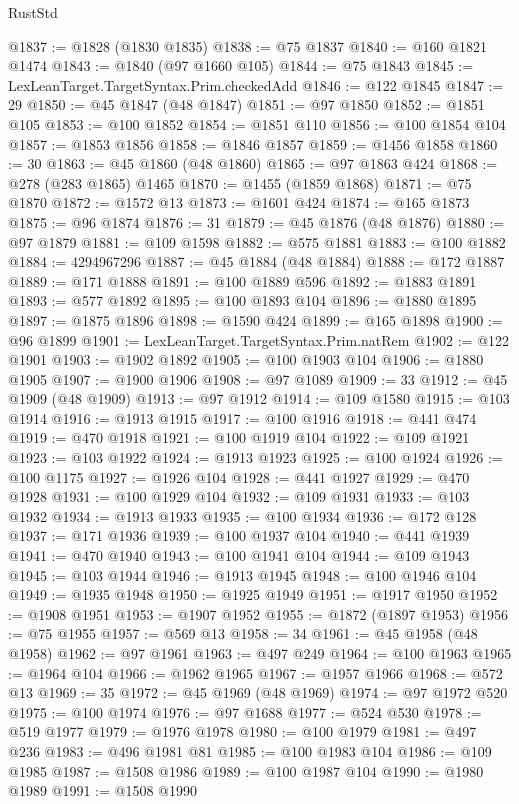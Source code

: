 \begin{lexlean}{RustStd}
\begin{coremodule}
@1837 := @1828 (@1830 @1835)
@1838 := @75 @1837
@1840 := @160 @1821 @1474
@1843 := @1840 (@97 @1660 @105)
@1844 := @75 @1843
@1845 := LexLeanTarget.TargetSyntax.Prim.checkedAdd
@1846 := @122 @1845
@1847 := 29
@1850 := @45 @1847 (@48 @1847)
@1851 := @97 @1850
@1852 := @1851 @105
@1853 := @100 @1852
@1854 := @1851 @110
@1856 := @100 @1854 @104
@1857 := @1853 @1856
@1858 := @1846 @1857
@1859 := @1456 @1858
@1860 := 30
@1863 := @45 @1860 (@48 @1860)
@1865 := @97 @1863 @424
@1868 := @278 (@283 @1865) @1465
@1870 := @1455 (@1859 @1868)
@1871 := @75 @1870
@1872 := @1572 @13
@1873 := @1601 @424
@1874 := @165 @1873
@1875 := @96 @1874
@1876 := 31
@1879 := @45 @1876 (@48 @1876)
@1880 := @97 @1879
@1881 := @109 @1598
@1882 := @575 @1881
@1883 := @100 @1882
@1884 := 4294967296
@1887 := @45 @1884 (@48 @1884)
@1888 := @172 @1887
@1889 := @171 @1888
@1891 := @100 @1889 @596
@1892 := @1883 @1891
@1893 := @577 @1892
@1895 := @100 @1893 @104
@1896 := @1880 @1895
@1897 := @1875 @1896
@1898 := @1590 @424
@1899 := @165 @1898
@1900 := @96 @1899
@1901 := LexLeanTarget.TargetSyntax.Prim.natRem
@1902 := @122 @1901
@1903 := @1902 @1892
@1905 := @100 @1903 @104
@1906 := @1880 @1905
@1907 := @1900 @1906
@1908 := @97 @1089
@1909 := 33
@1912 := @45 @1909 (@48 @1909)
@1913 := @97 @1912
@1914 := @109 @1580
@1915 := @103 @1914
@1916 := @1913 @1915
@1917 := @100 @1916
@1918 := @441 @474
@1919 := @470 @1918
@1921 := @100 @1919 @104
@1922 := @109 @1921
@1923 := @103 @1922
@1924 := @1913 @1923
@1925 := @100 @1924
@1926 := @100 @1175
@1927 := @1926 @104
@1928 := @441 @1927
@1929 := @470 @1928
@1931 := @100 @1929 @104
@1932 := @109 @1931
@1933 := @103 @1932
@1934 := @1913 @1933
@1935 := @100 @1934
@1936 := @172 @128
@1937 := @171 @1936
@1939 := @100 @1937 @104
@1940 := @441 @1939
@1941 := @470 @1940
@1943 := @100 @1941 @104
@1944 := @109 @1943
@1945 := @103 @1944
@1946 := @1913 @1945
@1948 := @100 @1946 @104
@1949 := @1935 @1948
@1950 := @1925 @1949
@1951 := @1917 @1950
@1952 := @1908 @1951
@1953 := @1907 @1952
@1955 := @1872 (@1897 @1953)
@1956 := @75 @1955
@1957 := @569 @13
@1958 := 34
@1961 := @45 @1958 (@48 @1958)
@1962 := @97 @1961
@1963 := @497 @249
@1964 := @100 @1963
@1965 := @1964 @104
@1966 := @1962 @1965
@1967 := @1957 @1966
@1968 := @572 @13
@1969 := 35
@1972 := @45 @1969 (@48 @1969)
@1974 := @97 @1972 @520
@1975 := @100 @1974
@1976 := @97 @1688
@1977 := @524 @530
@1978 := @519 @1977
@1979 := @1976 @1978
@1980 := @100 @1979
@1981 := @497 @236
@1983 := @496 @1981 @81
@1985 := @100 @1983 @104
@1986 := @109 @1985
@1987 := @1508 @1986
@1989 := @100 @1987 @104
@1990 := @1980 @1989
@1991 := @1508 @1990

\end{coremodule}
\end{lexlean}
